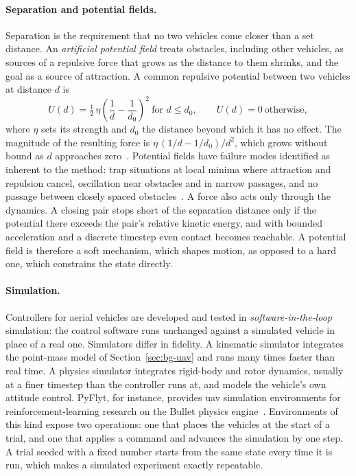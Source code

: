 \paragraph{Separation and potential fields.} Separation is the requirement that no two vehicles
come closer than a set distance. An \emph{artificial potential field} treats obstacles, including
other vehicles, as sources of a repulsive force that grows as the distance to them shrinks, and
the goal as a source of attraction. A common repulsive potential between two vehicles at distance
$d$ is
\begin{equation}
  \label{eq:apf}
  U(d) = \tfrac{1}{2}\,\eta \left(\frac{1}{d} - \frac{1}{d_0}\right)^{2} \ \text{for } d \leq d_0,
  \qquad U(d) = 0 \ \text{otherwise},
\end{equation}
where $\eta$ sets its strength and $d_0$ the distance beyond which it has no effect. The magnitude
of the resulting force is $\eta\,(1/d - 1/d_0)/d^2$, which grows without bound as $d$ approaches
zero~\cite{khatib1986}. Potential fields have failure modes identified as
inherent to the method: trap situations at local minima where attraction and repulsion cancel,
oscillation near obstacles and in narrow passages, and no passage between closely spaced
obstacles~\cite{koren1991}. A force also acts only through the dynamics. A closing pair stops short
of the separation distance only if the potential there exceeds the pair's relative kinetic energy,
and with bounded acceleration and a discrete timestep even contact becomes reachable. A potential
field is therefore a soft mechanism, which shapes motion, as opposed to a hard one, which
constrains the state directly.

\paragraph{Simulation.} Controllers for aerial vehicles are developed and tested in
\emph{software-in-the-loop} simulation: the control software runs unchanged against a simulated
vehicle in place of a real one. Simulators differ in fidelity. A kinematic simulator integrates the
point-mass model of Section~\ref{sec:bg-uav} and runs many times faster than real time. A physics
simulator integrates rigid-body and rotor dynamics, usually at a finer timestep than the controller
runs at, and models the vehicle's own attitude control. PyFlyt, for instance, provides \gls{uav}
simulation environments for reinforcement-learning research on the Bullet physics
engine~\cite{pyflyt}. Environments of this kind expose two operations: one that places the vehicles
at the start of a trial, and one that applies a command and advances the simulation by one step.
A trial seeded with a fixed number starts from the same state every time it is run, which makes a
simulated experiment exactly repeatable.

